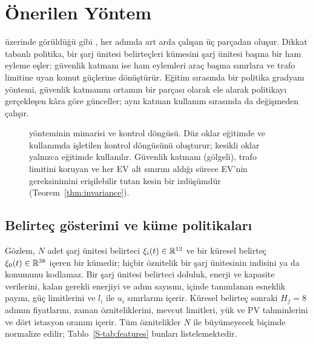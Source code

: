 \section{Önerilen Yöntem}\label{sec:method}

 üzerinde görüldüğü gibi \method{}, her adımda art arda çalışan üç parçadan oluşur.
Dikkat tabanlı politika, bir şarj ünitesi belirteçleri kümesini şarj ünitesi başına bir ham eyleme eşler; güvenlik katmanı ise ham eylemleri araç başına sınırlara ve trafo limitine uyan komut güçlerine dönüştürür.
Eğitim sırasında bir politika gradyanı yöntemi, güvenlik katmanını ortamın bir parçası olarak ele alarak politikayı gerçekleşen kâra göre günceller; aynı katman kullanım sırasında da değişmeden çalışır.

\begin{figure}[t]
\centering
{}
\caption{\method{} yönteminin mimarisi ve kontrol döngüsü. Düz oklar eğitimde ve kullanımda işletilen kontrol döngüsünü oluşturur; kesikli oklar yalnızca eğitimde kullanılır. Güvenlik katmanı (gölgeli), trafo limitini koruyan ve her EV alt sınırını aldığı sürece EV'nin gereksinimini erişilebilir tutan kesin bir izdüşümdür (Teorem~\ref{thm:invariance}).}
\label{fig:architecture}
\end{figure}

\subsection{Belirteç gösterimi ve küme politikaları}\label{sec:policy}

Gözlem, $N$ adet şarj ünitesi belirteci $\xi_i(t)\in\mathbb R^{12}$ ve bir küresel belirteç $\xi_0(t)\in\mathbb R^{38}$ içeren bir kümedir; hiçbir öznitelik bir şarj ünitesinin indisini ya da konumunu kodlamaz.
Bir şarj ünitesi belirteci doluluk, enerji ve kapasite verilerini, kalan gerekli enerjiyi ve adım sayısını,  içinde tanımlanan esneklik payını, güç limitlerini ve $l_i$ ile $u_i$ sınırlarını içerir.
Küresel belirteç sonraki $H_f=8$ adımın fiyatlarını, zaman özniteliklerini, mevcut limitleri, yük ve PV tahminlerini ve dört istasyon oranını içerir.
Tüm öznitelikler $N$ ile büyümeyecek biçimde normalize edilir; Tablo~\ref{S-tab:features} bunları listelemektedir.

